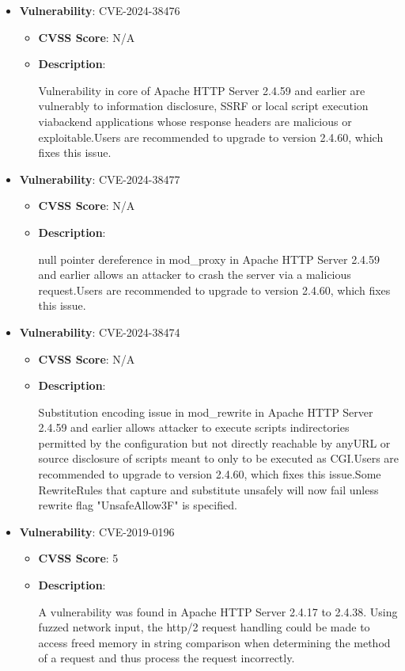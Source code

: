 \documentclass{article}
\begin{document}
\begin{itemize}
        \item \textbf{Vulnerability}: CVE-2024-38476
        \begin{itemize}
            \item \textbf{CVSS Score}:  N/A 
            \item \textbf{Description}:
            \parbox[t]{0.9\linewidth}{
                \ttfamily Vulnerability in core of Apache HTTP Server 2.4.59 and earlier are vulnerably to information disclosure, SSRF or local script execution viabackend applications whose response headers are malicious or exploitable.Users are recommended to upgrade to version 2.4.60, which fixes this issue.
            }
        \end{itemize}
    
        \item \textbf{Vulnerability}: CVE-2024-38477
        \begin{itemize}
            \item \textbf{CVSS Score}:  N/A 
            \item \textbf{Description}:
            \parbox[t]{0.9\linewidth}{
                \ttfamily null pointer dereference in mod\_proxy in Apache HTTP Server 2.4.59 and earlier allows an attacker to crash the server via a malicious request.Users are recommended to upgrade to version 2.4.60, which fixes this issue.
            }
        \end{itemize}
    
        \item \textbf{Vulnerability}: CVE-2024-38474
        \begin{itemize}
            \item \textbf{CVSS Score}:  N/A 
            \item \textbf{Description}:
            \parbox[t]{0.9\linewidth}{
                \ttfamily Substitution encoding issue in mod\_rewrite in Apache HTTP Server 2.4.59 and earlier allows attacker to execute scripts indirectories permitted by the configuration but not directly reachable by anyURL or source disclosure of scripts meant to only to be executed as CGI.Users are recommended to upgrade to version 2.4.60, which fixes this issue.Some RewriteRules that capture and substitute unsafely will now fail unless rewrite flag "UnsafeAllow3F" is specified.
            }
        \end{itemize}
    
        \item \textbf{Vulnerability}: CVE-2019-0196
        \begin{itemize}
            \item \textbf{CVSS Score}:  5 
            \item \textbf{Description}:
            \parbox[t]{0.9\linewidth}{
                \ttfamily A vulnerability was found in Apache HTTP Server 2.4.17 to 2.4.38. Using fuzzed network input, the http/2 request handling could be made to access freed memory in string comparison when determining the method of a request and thus process the request incorrectly.
            }
        \end{itemize}
    

\end{itemize}
\end{document}
